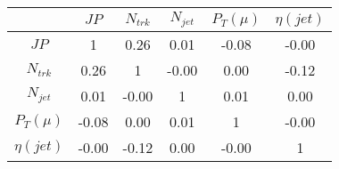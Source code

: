 \begin{tabular}{|c|c|c|c|c|c|} 
\hline
 & $JP$ & $N_{trk}$ & $N_{jet}$ & $P_{T} (\mu)$ & $\eta (jet)$ \\ \hline
$JP$ & 1 & 0.26 & 0.01 & -0.08 & -0.00 \\
$N_{trk}$ & 0.26 & 1 & -0.00 & 0.00 & -0.12 \\
$N_{jet}$ & 0.01 & -0.00 & 1 & 0.01 & 0.00 \\
$P_{T} (\mu)$ & -0.08 & 0.00 & 0.01 & 1 & -0.00 \\
$\eta (jet)$ & -0.00 & -0.12 & 0.00 & -0.00 & 1 \\
\hline 
\end{tabular} 


